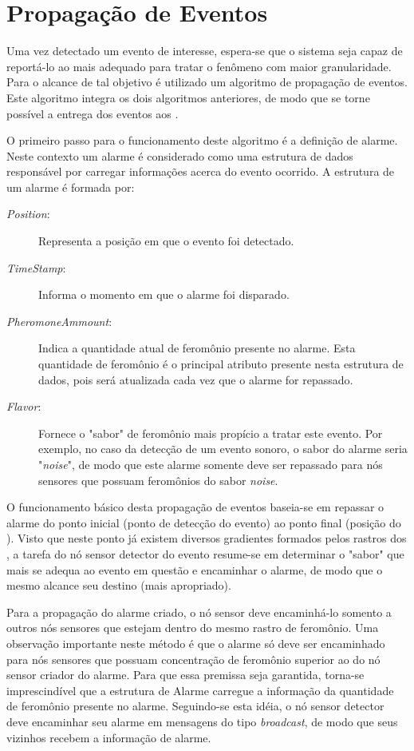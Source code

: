 \section{Propagação de Eventos}
Uma vez detectado um evento de interesse, espera-se que o sistema seja capaz de reportá-lo ao \vant mais adequado para tratar o fenômeno com maior granularidade. Para o alcance de tal objetivo é utilizado um algoritmo de propagação de eventos. Este algoritmo integra os dois algoritmos anteriores, de modo que se torne possível a entrega dos eventos aos \vants.

O primeiro passo para o funcionamento deste algoritmo é a definição de alarme. Neste contexto um alarme é considerado como uma estrutura de dados responsável por carregar informações acerca do evento ocorrido. A estrutura de um alarme é formada por:

\begin{description}
	\item[\emph{Position}:]  Representa a posição em que o evento foi detectado.
	\item[\emph{TimeStamp}:] Informa o momento em que o alarme foi disparado.
	\item[\emph{PheromoneAmmount}:] Indica a quantidade atual de feromônio presente no alarme. Esta quantidade de feromônio é o principal atributo presente nesta estrutura de dados, pois será atualizada cada vez que o alarme for repassado.
	\item[\emph{Flavor}:] Fornece o "sabor" de feromônio mais propício a tratar este evento. Por exemplo, no caso da detecção de um evento sonoro, o sabor do alarme seria "\emph{noise}", de modo que este alarme somente deve ser repassado para nós sensores que possuam feromônios do sabor \emph{noise}.
\end{description}

O funcionamento básico desta propagação de eventos baseia-se em repassar o alarme do ponto inicial (ponto de detecção do evento) ao ponto final (posição do \vant). Visto que neste ponto já existem diversos gradientes formados pelos rastros dos \vants, a tarefa do nó sensor detector do evento resume-se em determinar o "sabor"  que mais se adequa ao evento em questão e encaminhar o alarme, de modo que o mesmo alcance seu destino (\vant mais apropriado).

Para a propagação do alarme criado, o nó sensor deve encaminhá-lo somento a outros nós sensores que estejam dentro do mesmo rastro de feromônio. Uma observação importante neste método é que o alarme só deve ser encaminhado para nós sensores que possuam concentração de feromônio superior ao do nó sensor criador do alarme. Para que essa premissa seja garantida,  torna-se imprescindível que a estrutura de Alarme carregue a informação da quantidade de feromônio presente no alarme. Seguindo-se esta idéia, o nó sensor detector deve encaminhar seu alarme em mensagens do tipo \emph{broadcast}, de modo que seus vizinhos recebem a informação de alarme. 

